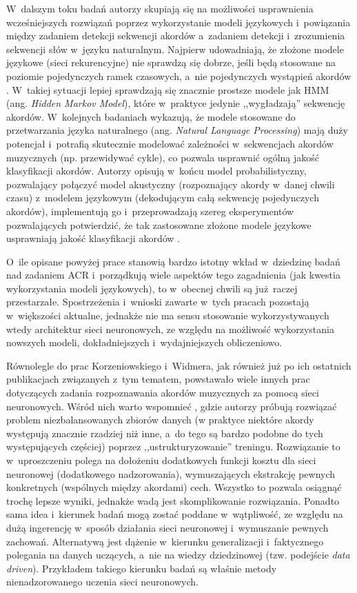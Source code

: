 W~dalszym toku badań autorzy skupiają się na możliwości usprawnienia wcześniejszych rozwiązań poprzez wykorzystanie modeli językowych i~powiązania między zadaniem detekcji sekwencji akordów a~zadaniem detekcji i~zrozumienia sekwencji słów w~języku naturalnym. Najpierw udowadniają, że złożone modele językowe (sieci rekurencyjne) nie sprawdzą się dobrze, jeśli będą stosowane na poziomie pojedynczych ramek czasowych, a~nie pojedynczych wystąpień akordów \cite{korzeniowski_futility_2017}. W~takiej sytuacji lepiej sprawdzają się znacznie prostsze modele jak HMM (ang. \emph{Hidden Markov Model}), które w~praktyce jedynie ,,wygładzają'' sekwencję akordów. W~kolejnych badaniach \cite{korzeniowski_large-scale_2018} wykazują, że modele stosowane do przetwarzania języka naturalnego (ang. \emph{Natural Language Processing}) mają duży potencjał i~potrafią skutecznie modelować zależności w~sekwencjach akordów muzycznych (np. przewidywać cykle), co pozwala usprawnić ogólną jakość klasyfikacji akordów. Autorzy opisują w~końcu model probabilistyczny, pozwalający połączyć model akustyczny (rozpoznający akordy w~danej chwili czasu) z~modelem językowym (dekodującym całą sekwencję pojedynczych akordów), implementują go i~przeprowadzają szereg eksperymentów pozwalających potwierdzić, że tak zastosowane złożone modele językowe usprawniają jakość klasyfikacji akordów \cite{korzeniowski_improved_2018}.

O~ile opisane powyżej prace stanowią bardzo istotny wkład w~dziedzinę badań nad zadaniem ACR i~porządkują wiele aspektów tego zagadnienia (jak kwestia wykorzystania modeli językowych), to w~obecnej chwili są już raczej przestarzałe. Spostrzeżenia i~wnioski zawarte w~tych pracach pozostają w~większości aktualne, jednakże nie ma sensu stosowanie wykorzystywanych wtedy architektur sieci neuronowych, ze względu na możliwość wykorzystania nowszych modeli, dokładniejszych i~wydajniejszych obliczeniowo.

Równolegle do prac Korzeniowskiego i~Widmera, jak również już po ich ostatnich publikacjach związanych z~tym tematem, powstawało wiele innych prac dotyczących zadania rozpoznawania akordów muzycznych za pomocą sieci neuronowych. Wśród nich warto wspomnieć \cite{mcfee_structured_2017}, gdzie autorzy próbują rozwiązać problem niezbalansowanych zbiorów danych (w praktyce niektóre akordy występują znacznie rzadziej niż inne, a~do tego są bardzo podobne do tych występujących częściej) poprzez ,,ustrukturyzowanie'' treningu. Rozwiązanie to w~uproszczeniu polega na dołożeniu dodatkowych funkcji kosztu dla sieci neuronowej (dodatkowego nadzorowania), wymuszających ekstrakcję pewnych konkretnych (wspólnych między akordami) cech. Wszystko to pozwala osiągnąć trochę lepsze wyniki, jednakże wadą jest skomplikowanie rozwiązania. Ponadto sama idea i~kierunek badań mogą zostać poddane w~wątpliwość, ze względu na dużą ingerencję w~sposób działania sieci neuronowej i~wymuszanie pewnych zachowań. Alternatywą jest dążenie w~kierunku generalizacji i~faktycznego polegania na danych uczących, a~nie na wiedzy dziedzinowej (tzw. podejście \emph{data driven}). Przykładem takiego kierunku badań są właśnie metody nienadzorowanego uczenia sieci neuronowych.

